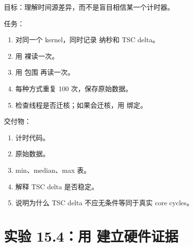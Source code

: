 \begin{labbox}
目标：理解时间源差异，而不是盲目相信某一个计时器。

任务：

\begin{enumerate}
  \item 对同一个  kernel，同时记录  纳秒和 TSC delta。
  \item 用  裸读一次。
  \item 用  包围  再读一次。
  \item 每种方式重复 100 次，保存原始数据。
  \item 检查线程是否迁核；如果会迁核，用  绑定。
\end{enumerate}

交付物：

\begin{enumerate}
  \item 计时代码。
  \item 原始数据。
  \item min、median、max 表。
  \item 解释 TSC delta 是否稳定。
  \item 说明为什么 TSC delta 不应无条件等同于真实 core cycles。
\end{enumerate}
\end{labbox}

\section{实验 15.4：用  建立硬件证据}

